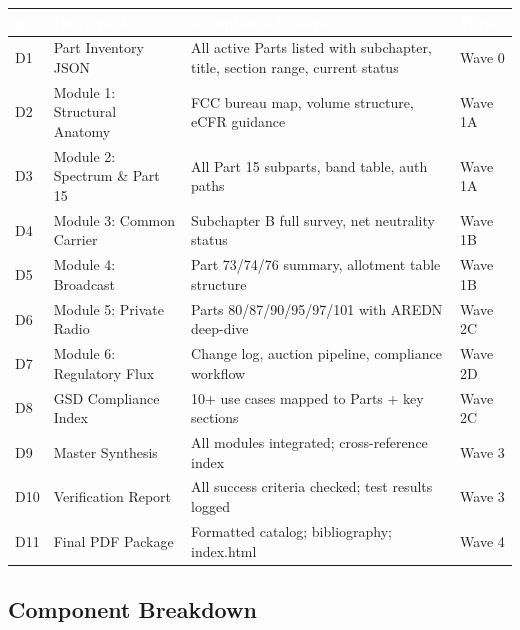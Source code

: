 \documentclass[11pt,letterpaper]{article}
\newcommand{\tableheader}[1]{\textbf{\sffamily\textcolor{white}{#1}}}
\begin{document}
\begin{center}
\begin{tabularx}{\textwidth}{C{0.8cm}L{4cm}XC{2cm}}
\toprule
{}
\tableheader{\#} & \tableheader{Deliverable} & \tableheader{Acceptance Criteria} & \tableheader{Wave} \\
\midrule
D1 & Part Inventory JSON & All active Parts listed with subchapter, title, section range, current status & Wave 0 \\
D2 & Module 1: Structural Anatomy & FCC bureau map, volume structure, eCFR guidance & Wave 1A \\
D3 & Module 2: Spectrum \& Part 15 & All Part 15 subparts, band table, auth paths & Wave 1A \\
D4 & Module 3: Common Carrier & Subchapter B full survey, net neutrality status & Wave 1B \\
D5 & Module 4: Broadcast & Part 73/74/76 summary, allotment table structure & Wave 1B \\
D6 & Module 5: Private Radio & Parts 80/87/90/95/97/101 with AREDN deep-dive & Wave 2C \\
D7 & Module 6: Regulatory Flux & Change log, auction pipeline, compliance workflow & Wave 2D \\
D8 & GSD Compliance Index & 10+ use cases mapped to Parts + key sections & Wave 2C \\
D9 & Master Synthesis & All modules integrated; cross-reference index & Wave 3 \\
D10 & Verification Report & All success criteria checked; test results logged & Wave 3 \\
D11 & Final PDF Package & Formatted catalog; bibliography; index.html & Wave 4 \\
\bottomrule
\end{tabularx}
\end{center}

\subsection{Component Breakdown}
\end{document}
